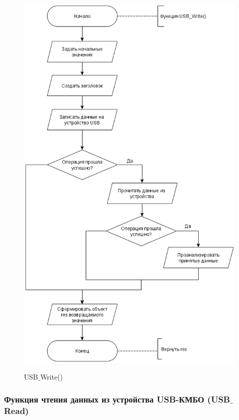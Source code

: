 	\begin{figure}[ph!]
		\centering
		\begin{center}
			{\includegraphics[scale=0.5]{schemes/usb_write.png}}
			\caption{USB$\_$Write()}
			\label{fig4:image}
		\end{center}
	\end{figure}

	\newpage

	\subsubsection{Функция чтения данных из устройства USB-КМБО (USB$\_$Read)}
	
